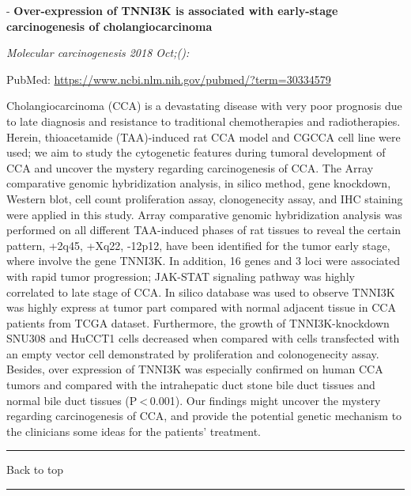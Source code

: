 \documentclass[]{article}
\begin{document}
 - \textbf{Over-expression of TNNI3K is associated with early-stage
carcinogenesis of cholangiocarcinoma}

\emph{Molecular carcinogenesis 2018 Oct;():}

PubMed: \url{https://www.ncbi.nlm.nih.gov/pubmed/?term=30334579}

Cholangiocarcinoma (CCA) is a devastating disease with very poor
prognosis due to late diagnosis and resistance to traditional
chemotherapies and radiotherapies. Herein, thioacetamide (TAA)-induced
rat CCA model and CGCCA cell line were used; we aim to study the
cytogenetic features during tumoral development of CCA and uncover the
mystery regarding carcinogenesis of CCA. The Array comparative genomic
hybridization analysis, in silico method, gene knockdown, Western blot,
cell count proliferation assay, clonogenecity assay, and IHC staining
were applied in this study. Array comparative genomic hybridization
analysis was performed on all different TAA-induced phases of rat
tissues to reveal the certain pattern, +2q45, +Xq22, -12p12, have been
identified for the tumor early stage, where involve the gene TNNI3K. In
addition, 16 genes and 3 loci were associated with rapid tumor
progression; JAK-STAT signaling pathway was highly correlated to late
stage of CCA. In silico database was used to observe TNNI3K was highly
express at tumor part compared with normal adjacent tissue in CCA
patients from TCGA dataset. Furthermore, the growth of TNNI3K-knockdown
SNU308 and HuCCT1 cells decreased when compared with cells transfected
with an empty vector cell demonstrated by proliferation and
colonogenecity assay. Besides, over expression of TNNI3K was especially
confirmed on human CCA tumors and compared with the intrahepatic duct
stone bile duct tissues and normal bile duct tissues
(P \textless{} 0.001). Our findings might uncover the mystery regarding
carcinogenesis of CCA, and provide the potential genetic mechanism to
the clinicians some ideas for the patients' treatment.

{}

{}

\begin{center}\rule{0.5\linewidth}{\linethickness}\end{center}

Back to top

\begin{center}\rule{0.5\linewidth}{\linethickness}\end{center}

\pagebreak
\end{document}
